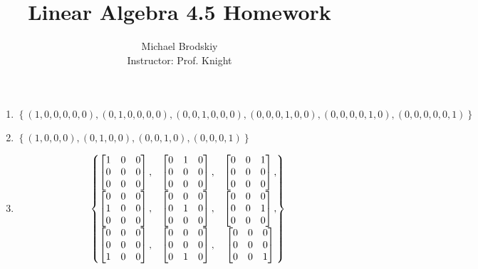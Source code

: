 \documentclass[12pt]{article}
\title{Linear Algebra 4.5 Homework}
\date{}
\author{Michael Brodskiy\\ \small Instructor: Prof. Knight}
\begin{document}
\maketitle

\begin{enumerate}

    \begin{center}
    \underline{Problems 1-6, 10, 13, 15, 18, 22, 23, 25, 33, 37, 41, 45, 47, 67, 73, 78, 81}
    \end{center}

  \item $\left\{ (1,0,0,0,0,0),(0,1,0,0,0,0),(0,0,1,0,0,0),(0,0,0,1,0,0),(0,0,0,0,1,0),(0,0,0,0,0,1) \right\}$

  \item $\left\{ (1,0,0,0),(0,1,0,0),(0,0,1,0),(0,0,0,1) \right\}$

\item

    \begin{equation*}
      \begin{split}
        \begin{Bmatrix}\begin{bmatrix}1&0&0\\0&0&0\\0&0&0\end{bmatrix},&\begin{bmatrix}0&1&0\\0&0&0\\0&0&0\end{bmatrix},&\begin{bmatrix}0&0&1\\0&0&0\\0&0&0\end{bmatrix},\\\begin{bmatrix}0&0&0\\1&0&0\\0&0&0\end{bmatrix},&\begin{bmatrix}0&0&0\\0&1&0\\0&0&0\end{bmatrix},&\begin{bmatrix}0&0&0\\0&0&1\\0&0&0\end{bmatrix},\\\begin{bmatrix}0&0&0\\0&0&0\\1&0&0\end{bmatrix},&\begin{bmatrix}0&0&0\\0&0&0\\0&1&0\end{bmatrix},&\begin{bmatrix}0&0&0\\0&0&0\\0&0&1\end{bmatrix}\end{Bmatrix}
\end{split}
\label{1}
\end{equation}


\end{equation*}
\end{enumerate}
\end{document}
